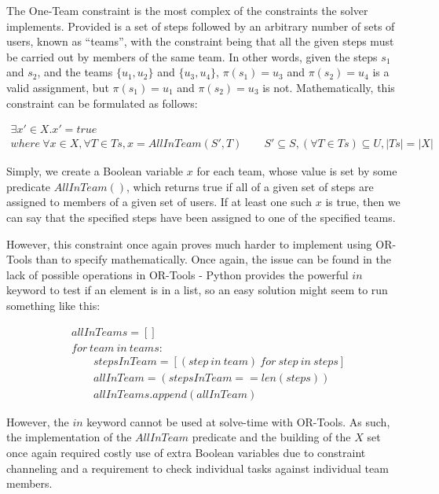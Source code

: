\documentclass[11pt]{article}
\begin{document}
			The One-Team constraint is the most complex of the constraints the solver implements.
			Provided is a set of steps followed by an arbitrary number of sets of users,
			known as ``teams'', with the constraint being that all the given steps must be carried out
			by members of the same team. In other words, given the steps \(s_1\) and \(s_2\),
			and the teams \(\{u_1, u_2\}\) and \(\{u_3, u_4\}\),
			\(\pi(s_1) = u_3\) and \(\pi(s_2) = u_4\) is a valid assignment, but \(\pi(s_1) = u_1\) and \(\pi(s_2) = u_3\) is not.
			Mathematically, this constraint can be formulated as follows:

			\begin{multline}
				\exists x' \in X . x' = true \\ where \ \forall x \in X, \forall T \in Ts, x = AllInTeam(S', T) \qquad S' \subseteq S, (\forall T \in Ts) \subseteq U, |Ts| = |X|
			\end{multline}

			Simply, we create a Boolean variable \(x\) for each team, whose value is set by some predicate \(AllInTeam()\),
			which returns true if all of a given set of steps are assigned to members of a given set of users.
			If at least one such \(x\) is true, then we can say that the specified steps have been assigned to one of the specified teams.

			However, this constraint once again proves much harder to implement using OR-Tools than to specify mathematically.
			Once again, the issue can be found in the lack of possible operations in OR-Tools -
			Python provides the powerful \(in\) keyword to test if an element is in a list,
			so an easy solution might seem to run something like this:

			\begin{align*}
				&allInTeams = [] \\
				&for \ team \ in \ teams:\\
				&\qquad stepsInTeam = [(step \ in \ team) \ for \ step \ in \ steps]\\
				&\qquad allInTeam = (stepsInTeam == len(steps))\\
				&\qquad allInTeams.append(allInTeam)
			\end{align*}

			However, the \(in\) keyword cannot be used at solve-time with OR-Tools.
			As such, the implementation of the \(AllInTeam\) predicate and the building of the \(X\) set
			once again required costly use of extra Boolean variables due to constraint channeling and
			a requirement to check individual tasks against individual team members.
\end{document}
